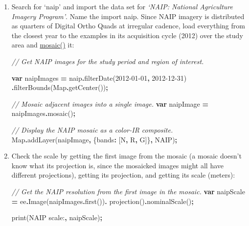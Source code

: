 \documentclass[
]{article}
\newenvironment{Shaded}{\begin{snugshade}}{\end{snugshade}}
\newcommand{\BuiltInTok}[1]{#1}
\newcommand{\CommentTok}[1]{\textcolor[rgb]{0.56,0.35,0.01}{\textit{#1}}}
\newcommand{\DataTypeTok}[1]{\textcolor[rgb]{0.13,0.29,0.53}{#1}}
\newcommand{\FunctionTok}[1]{\textcolor[rgb]{0.00,0.00,0.00}{#1}}
\newcommand{\KeywordTok}[1]{\textcolor[rgb]{0.13,0.29,0.53}{\textbf{#1}}}
\newcommand{\NormalTok}[1]{#1}
\newcommand{\OperatorTok}[1]{\textcolor[rgb]{0.81,0.36,0.00}{\textbf{#1}}}
\newcommand{\StringTok}[1]{\textcolor[rgb]{0.31,0.60,0.02}{#1}}
\begin{document}
\begin{enumerate}
\def\labelenumi{\arabic{enumi}.}
\item
  Search for `naip' and import the data set for \emph{`NAIP: National Agriculture Imagery Program'}. Name the import naip. Since NAIP imagery is distributed as quarters of Digital Ortho Quads at irregular cadence, load everything from the closest year to the examples in its acquisition cycle (2012) over the study area and \href{https://developers.google.com/earth-engine/guides/ic_composite_mosaic}{mosaic()} it:

\begin{Shaded}
\begin{Highlighting}[]
\CommentTok{// Get NAIP images for the study period and region of interest.}

\KeywordTok{var}\NormalTok{ naipImages }\OperatorTok{=}\NormalTok{ naip}\OperatorTok{.}\FunctionTok{filterDate}\NormalTok{(}\StringTok{\textquotesingle{}2012{-}01{-}01\textquotesingle{}}\OperatorTok{,} \StringTok{\textquotesingle{}2012{-}12{-}31\textquotesingle{}}\NormalTok{)}
\OperatorTok{.}\FunctionTok{filterBounds}\NormalTok{(}\BuiltInTok{Map}\OperatorTok{.}\FunctionTok{getCenter}\NormalTok{())}\OperatorTok{;}

\CommentTok{// Mosaic adjacent images into a single image.}
\KeywordTok{var}\NormalTok{ naipImage }\OperatorTok{=}\NormalTok{ naipImages}\OperatorTok{.}\FunctionTok{mosaic}\NormalTok{()}\OperatorTok{;}

\CommentTok{// Display the NAIP mosaic as a color{-}IR composite.}
\BuiltInTok{Map}\OperatorTok{.}\FunctionTok{addLayer}\NormalTok{(naipImage}\OperatorTok{,}\NormalTok{ \{}\DataTypeTok{bands}\OperatorTok{:}\NormalTok{ [}\StringTok{\textquotesingle{}N\textquotesingle{}}\OperatorTok{,} \StringTok{\textquotesingle{}R\textquotesingle{}}\OperatorTok{,} \StringTok{\textquotesingle{}G\textquotesingle{}}\NormalTok{]\}}\OperatorTok{,} \StringTok{\textquotesingle{}NAIP\textquotesingle{}}\NormalTok{)}\OperatorTok{;}
\end{Highlighting}
\end{Shaded}
\item
  Check the scale by getting the first image from the mosaic (a mosaic doesn't know what its projection is, since the mosaicked images might all have different projections), getting its projection, and getting its scale (meters):

\begin{Shaded}
\begin{Highlighting}[]
\CommentTok{// Get the NAIP resolution from the first image in the mosaic.}
\KeywordTok{var}\NormalTok{ naipScale }\OperatorTok{=}\NormalTok{ ee}\OperatorTok{.}\FunctionTok{Image}\NormalTok{(naipImages}\OperatorTok{.}\FunctionTok{first}\NormalTok{())}\OperatorTok{.}
              \FunctionTok{projection}\NormalTok{()}\OperatorTok{.}\FunctionTok{nominalScale}\NormalTok{()}\OperatorTok{;}

\FunctionTok{print}\NormalTok{(}\StringTok{\textquotesingle{}NAIP scale:\textquotesingle{}}\OperatorTok{,}\NormalTok{ naipScale)}\OperatorTok{;}
\end{Highlighting}
\end{Shaded}
\end{enumerate}
\end{document}
